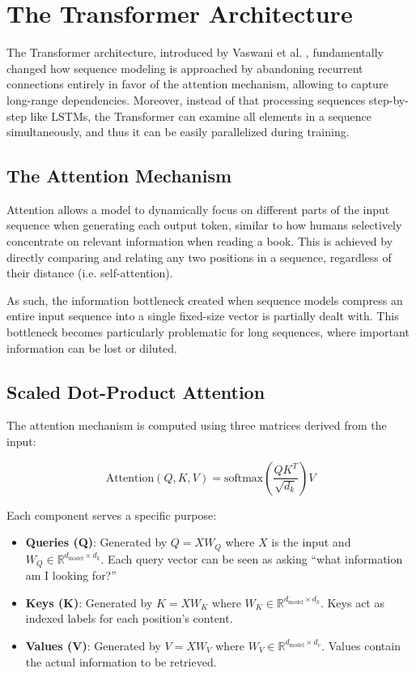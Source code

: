 \section{The Transformer Architecture}  \label{transformer_architecture}

The Transformer architecture, introduced by Vaswani et al. \cite{attention_is_all_you_need}, fundamentally changed how sequence modeling is approached by abandoning recurrent connections entirely in favor of the attention mechanism, allowing to capture long-range dependencies. Moreover, instead of that processing sequences step-by-step like LSTMs, the Transformer can examine all elements in a sequence simultaneously, and thus it can be easily parallelized during training.

\subsection{The Attention Mechanism}

Attention allows a model to dynamically focus on different parts of the input sequence when generating each output token, similar to how humans selectively concentrate on relevant information when reading a book. This is achieved by directly comparing and relating any two positions in a sequence, regardless of their distance (i.e. self-attention).

As such, the information bottleneck created when sequence models compress an entire input sequence into a single fixed-size vector is partially dealt with. This bottleneck becomes particularly problematic for long sequences, where important information can be lost or diluted.


\subsection{Scaled Dot-Product Attention}

The attention mechanism is computed using three matrices derived from the input:

\begin{equation}
\text{Attention}(Q, K, V) = \text{softmax}\left(\frac{QK^T}{\sqrt{d_k}}\right)V
\end{equation}

Each component serves a specific purpose:

\begin{itemize}
   \item \textbf{Queries (Q)}: Generated by $Q = XW_Q$ where $X$ is the input and $W_Q \in \mathbb{R}^{d_{\text{model}} \times d_k}$. Each query vector can be seen as asking ``what information am I looking for?''
   \item \textbf{Keys (K)}: Generated by $K = XW_K$ where $W_K \in \mathbb{R}^{d_{\text{model}} \times d_k}$. Keys act as indexed labels for each position's content.
   \item \textbf{Values (V)}: Generated by $V = XW_V$ where $W_V \in \mathbb{R}^{d_{\text{model}} \times d_v}$. Values contain the actual information to be retrieved.
\end{itemize}

